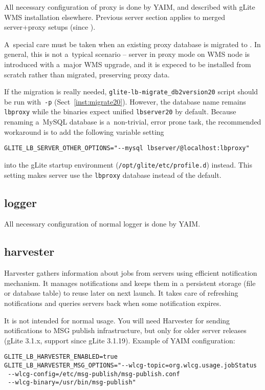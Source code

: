All necessary configuration of \LB proxy is done by YAIM,
and described with gLite WMS installation elsewhere.
Previous \LB server section applies to merged server+proxy setups (since ).

A~special care must be taken when an existing \LB proxy database
is migrated to .
In general, this is not a~typical scenario --  server in proxy mode
on WMS node is introduced with a~major WMS upgrade, and it is expeced
to be installed from scratch rather than migrated, preserving \LB proxy data.

If the migration is really needed, \verb'glite-lb-migrate_db2version20'
script should be run with~\verb'-p' (Sect~\ref{inst:migrate20}).
However, the \LB database name remains \verb'lbproxy' while
the  binaries expect unified \verb'lbserver20' by default.
Because renaming a~MySQL database is a~non-trivial, error prone task,
the recommended workaround is to add the following variable setting

\verb'GLITE_LB_SERVER_OTHER_OPTIONS="--mysql lbserver/@localhost:lbproxy"' 

into the gLite startup environment (\verb'/opt/glite/etc/profile.d') instead.
This setting makes \LB server use the \verb'lbproxy' database instead of the default.

\subsection{\LB logger}

All necessary configuration of normal \LB logger is done by YAIM.

\subsection{\LB harvester}

\LB Harvester gathers information about jobs from \LB servers using efficient
\LB notification mechanism. It manages notifications and keeps them in
a persistent storage (file or database table) to reuse later on next launch.
It takes care of refreshing notifications and queries \LB servers back when
some notification expires.

It is not intended for normal usage. You will need Harvester for sending notifications to MSG publish infrastructure, but only for older \LB server releases (gLite 3.1.x, support since gLite 3.1.19). Example of YAIM configuration:

\begin{verbatim}
GLITE_LB_HARVESTER_ENABLED=true
GLITE_LB_HARVESTER_MSG_OPTIONS="--wlcg-topic=org.wlcg.usage.jobStatus 
 --wlcg-config=/etc/msg-publish/msg-publish.conf 
 --wlcg-binary=/usr/bin/msg-publish"
\end{verbatim}

